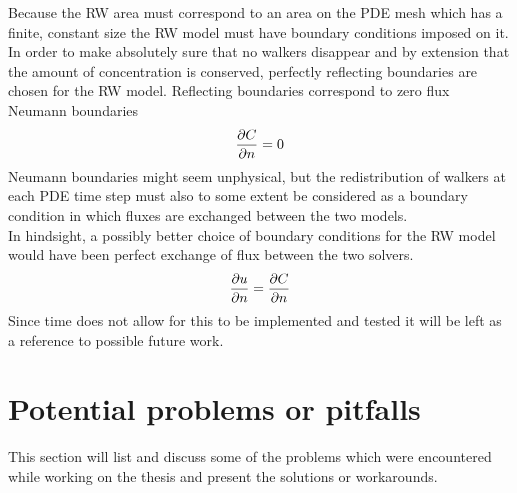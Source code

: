 Because the RW area must correspond to an area on the PDE mesh which has a finite, constant size the RW model must have boundary conditions imposed on it. 
In order to make absolutely sure that no walkers disappear and by extension that the amount of concentration is conserved, perfectly reflecting boundaries are chosen for the RW model. 
Reflecting boundaries correspond to zero flux Neumann boundaries
\begin{equation}
 \frac{\partial C}{\partial n} = 0
\end{equation}
Neumann boundaries might seem unphysical, but the redistribution of walkers at each PDE time step must also to some extent be considered as a boundary condition in which fluxes are exchanged between the two models. \\
In hindsight, a possibly better choice of boundary conditions for the RW model would have been perfect exchange of flux between the two solvers. 
\begin{equation}
 \frac{\partial u}{\partial n} = \frac{\partial C}{\partial n}
\end{equation}
Since time does not allow for this to be implemented and tested it will be left as a reference to possible future work.

\section{Potential problems or pitfalls}\label{problems_and_pitfalls}
 
 This section will list and discuss some of the problems which were encountered while working on the thesis and present the solutions or workarounds.

% 



